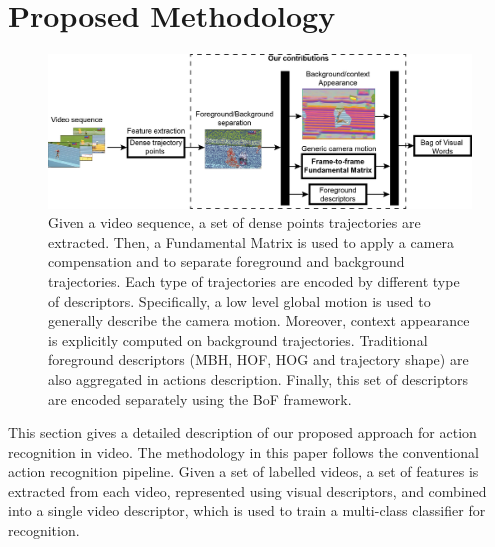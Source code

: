 \section{Proposed Methodology} \label{scene}

\begin{figure}[t!]
\begin{center}
\includegraphics[width=0.98\linewidth]{fig/pipeline.png}
\end{center}
\caption{Given a video sequence, a set of dense points trajectories are extracted. Then, a Fundamental Matrix is used to apply a camera compensation and to separate foreground and background trajectories. Each type of trajectories are encoded by different type of descriptors. Specifically, a low level global motion is used to generally describe the camera motion. Moreover, context appearance is explicitly computed on background trajectories. Traditional foreground descriptors (\eg MBH, HOF, HOG and trajectory shape) are also aggregated in actions description. Finally, this set of descriptors are encoded separately using the BoF framework.}
\label{fig:pipeline}
\end{figure}

This section gives a detailed description of our proposed approach for action recognition in video. The methodology in this paper follows the conventional action recognition pipeline. Given a set of labelled videos, a set of features is extracted from each video, represented using visual descriptors, and combined into a single video descriptor, which is used to train a multi-class classifier for recognition.


